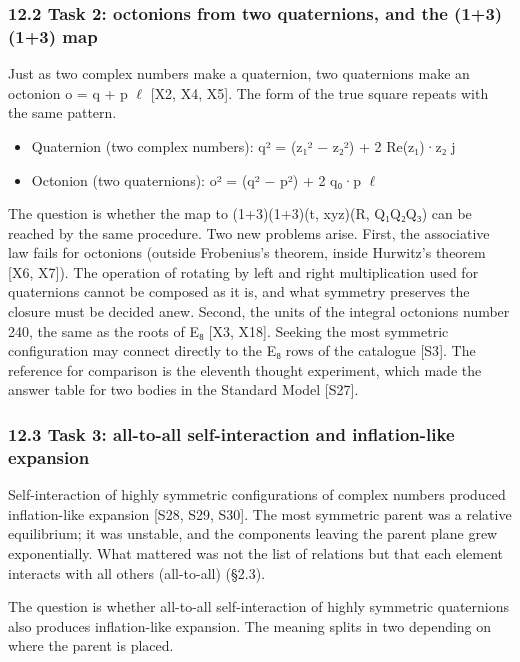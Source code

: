 \documentclass[
  a4paper,
]{article}
\providecommand{\tightlist}{%
  \setlength{\itemsep}{0pt}\setlength{\parskip}{0pt}}
\begin{document}
\subsubsection{12.2 Task 2: octonions from two quaternions, and the
(1+3)(1+3)
map}\label{task-2-octonions-from-two-quaternions-and-the-1313-map}

Just as two complex numbers make a quaternion, two quaternions make an
octonion o = q + p \(\ell\) {[}X2, X4, X5{]}. The form of the true
square repeats with the same pattern.

\begin{itemize}
\tightlist
\item
  Quaternion (two complex numbers): q² = (z₁² − \textbar z₂\textbar²) +
  2 Re(z₁)·z₂ j
\item
  Octonion (two quaternions): o² = (q² − \textbar p\textbar²) + 2 q₀·p
  \(\ell\)
\end{itemize}

The question is whether the map to (1+3)(1+3)(t, xyz)(R, Q₁Q₂Q₃) can be
reached by the same procedure. Two new problems arise. First, the
associative law fails for octonions (outside Frobenius's theorem, inside
Hurwitz's theorem {[}X6, X7{]}). The operation of rotating by left and
right multiplication used for quaternions cannot be composed as it is,
and what symmetry preserves the closure must be decided anew. Second,
the units of the integral octonions number 240, the same as the roots of
E₈ {[}X3, X18{]}. Seeking the most symmetric configuration may connect
directly to the E₈ rows of the catalogue {[}S3{]}. The reference for
comparison is the eleventh thought experiment, which made the answer
table for two bodies in the Standard Model {[}S27{]}.

\subsubsection{12.3 Task 3: all-to-all self-interaction and
inflation-like
expansion}\label{task-3-all-to-all-self-interaction-and-inflation-like-expansion}

Self-interaction of highly symmetric configurations of complex numbers
produced inflation-like expansion {[}S28, S29, S30{]}. The most
symmetric parent was a relative equilibrium; it was unstable, and the
components leaving the parent plane grew exponentially. What mattered
was not the list of relations but that each element interacts with all
others (all-to-all) (§2.3).

The question is whether all-to-all self-interaction of highly symmetric
quaternions also produces inflation-like expansion. The meaning splits
in two depending on where the parent is placed.
\end{document}

